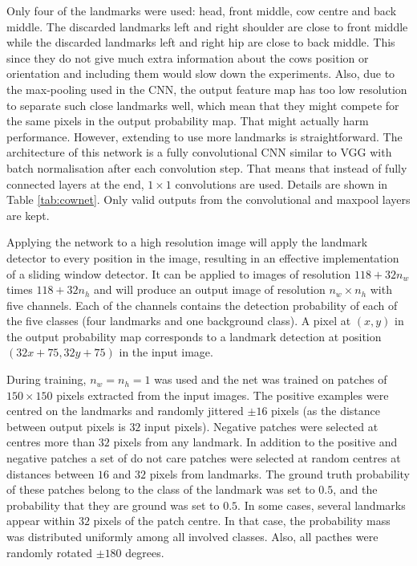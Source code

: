 \documentclass{cta-author}
\begin{document}
Only four of the landmarks were used: head, front middle, cow centre and back middle.
The discarded landmarks left and right shoulder are close to front middle while the discarded landmarks left
and right hip are close to back middle. This since they do not give much extra information about the cows position or
orientation and including them would slow down the experiments. Also, due to the max-pooling used in the CNN,
the output feature map has too low resolution to separate such close landmarks well, which mean that they
might compete for the same pixels in the output probability map. That might actually harm performance.
However, extending to use more landmarks is straightforward. The architecture of this network is a fully
convolutional CNN similar to VGG \cite{Simonyan14c} with batch normalisation
\cite{DBLP:journals/corr/IoffeS15} after each convolution step. That means that instead of fully connected
layers at the end, $1 \times 1$ convolutions are used. Details are shown in Table \ref{tab:cownet}. Only
valid outputs from the convolutional and maxpool layers are kept.

Applying the network to a high resolution image will apply the landmark detector to every position in the
image, resulting in an effective implementation of a sliding window detector. It can be applied to images of
resolution $118 + 32 n_w$ times $118 + 32 n_h$ and will produce an output image of resolution $n_w \times
n_h$ with five channels. Each of the channels contains the detection probability of each of the five classes
(four landmarks and one background class). A pixel at $\left(x, y\right)$ in the output probability map
corresponds to a landmark detection at position $\left(32 x + 75, 32 y + 75\right)$ in the input image.

During training, $n_w = n_h = 1$ was used and the net was trained on patches of $150\times 150$ pixels
extracted from the input images. The positive examples were centred on the landmarks and randomly jittered
$\pm 16$ pixels (as the distance between output pixels is $32$ input pixels). Negative patches were selected
at centres more than $32$ pixels from any landmark. In addition to the positive and negative patches a set of
do not care patches were selected at random centres at distances between $16$ and $32$ pixels from landmarks.
The ground truth probability of these patches belong to the class of the landmark was set to $0.5$, and the
probability that they are ground was set to $0.5$. In some cases, several landmarks appear within $32$ pixels
of the patch centre. In that case, the probability mass was distributed uniformly among all involved classes.
Also, all pacthes were randomly rotated $\pm 180$ degrees.
\end{document}
